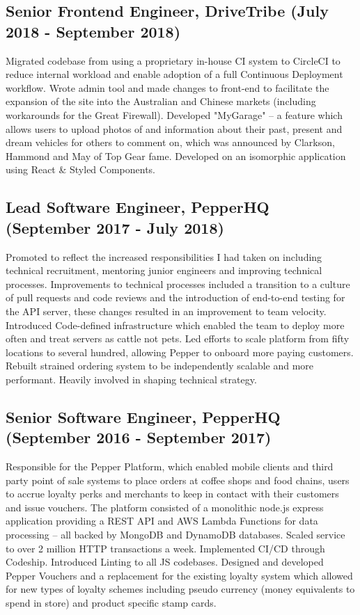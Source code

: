 \documentclass[10pt,letterpaper]{article}
\begin{document}
	\subsection*{Senior Frontend Engineer, DriveTribe \small{(July 2018 - September 2018)}}
	Migrated codebase from using a proprietary in-house CI system to CircleCI to reduce internal workload and enable adoption of a full Continuous Deployment workflow. Wrote admin tool and made changes to front-end to facilitate the expansion of the site into the Australian and Chinese markets (including workarounds for the Great Firewall). Developed "MyGarage" -- a feature which allows users to upload photos of and information about their past, present and dream vehicles for others to comment on, which was announced by Clarkson, Hammond and May of Top Gear fame. Developed on an isomorphic application using React \& Styled Components.
	
	\subsection*{Lead Software Engineer, PepperHQ \small{(September 2017 - July 2018)}}
	Promoted to reflect the increased responsibilities I had taken on including technical recruitment, mentoring junior engineers and improving technical processes. Improvements to technical processes included a transition to a culture of pull requests and code reviews and the introduction of end-to-end testing for the API server, these changes resulted in an improvement to team velocity. Introduced Code-defined infrastructure which enabled the team to deploy more often and treat servers as cattle not pets. Led efforts to scale platform from fifty locations to several hundred, allowing Pepper to onboard more paying customers. Rebuilt strained ordering system to be independently scalable and more performant. Heavily involved in shaping technical strategy.
	
	\subsection*{Senior Software Engineer, PepperHQ \small{(September 2016 - September 2017)}}
	Responsible for the Pepper Platform, which enabled mobile clients and third party point of sale systems to place orders at coffee shops and food chains, users to accrue loyalty perks and merchants to keep in contact with their customers and issue vouchers. The platform consisted of a monolithic node.js express application providing a REST API and AWS Lambda Functions for data processing -- all backed by MongoDB and DynamoDB databases. Scaled service to over 2 million HTTP transactions a week. Implemented CI/CD through Codeship. Introduced Linting to all JS codebases. Designed and developed Pepper Vouchers and a replacement for the existing loyalty system which allowed for new types of loyalty schemes including pseudo currency (money equivalents to spend in store) and product specific stamp cards.
	
\end{document}
